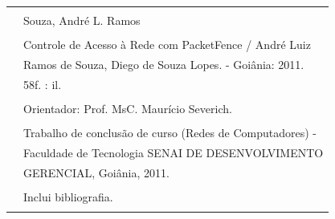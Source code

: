 \documentclass[12pt, brazil, ruledheader, pnumromarab,normaltoc]{abnt}
\begin{document}
\begin{minipage}{7cm}
\begin{center}
\vspace{.15\textwidth}
\begin{tabular}{|cl|} \hline
  \hspace{1.3cm} & \\
  & Souza, André L. Ramos\\
  & \\
  \hspace{0.2cm}  & \hspace{0.3cm} Controle de Acesso à Rede com PacketFence / André Luiz\\
  &  Ramos de Souza, Diego de Souza Lopes. - Goiânia: 2011.\\
  & \hspace{0.65cm} 58f. : il. \\
  & \\
  & \hspace{0.6cm} Orientador: Prof. MsC. Maurício Severich.\\
  & \\
  & \hspace{0.6cm} Trabalho de conclusão de curso (Redes de Computadores) -\\
  & \hspace{0.6cm} Faculdade de Tecnologia SENAI DE DESENVOLVIMENTO \\
  & \hspace{0.6cm} GERENCIAL, Goiânia, 2011.\\
  & \\
  & \hspace{0.6cm} Inclui bibliografia. \\
  & \\
 \hline
\end{tabular}
\end{center}
\end{minipage}
\end{document}
